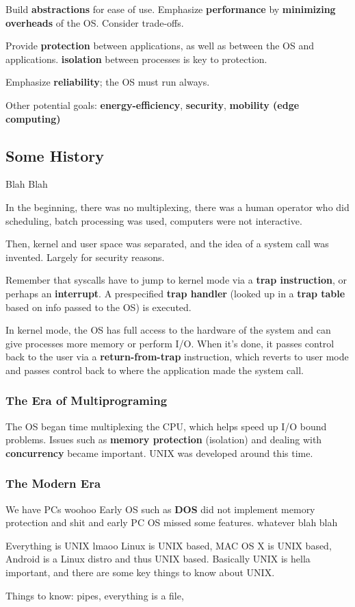 \documentclass{article}
\begin{document}
Build \textbf{abstractions} for ease of use.
Emphasize \textbf{performance} by \textbf{minimizing overheads} of the OS.
Consider trade-offs.

Provide \textbf{protection} between applications, as well as between the OS and applications.
\textbf{isolation} between processes is key to protection.

Emphasize \textbf{reliability}; the OS must run always.

Other potential goals: \textbf{energy-efficiency}, \textbf{security}, \textbf{mobility (edge computing)}

\subsection{Some History}

Blah Blah

In the beginning, there was no multiplexing, there was a human operator who did scheduling, batch processing was used, computers were not interactive.

Then, kernel and user space was separated, and the idea of a system call was invented.
Largely for security reasons.

Remember that syscalls have to jump to kernel mode via a \textbf{trap instruction}, or perhaps an \textbf{interrupt}.
A prespecified \textbf{trap handler} (looked up in a \textbf{trap table} based on info passed to the OS) is executed.

In kernel mode, the OS has full access to the hardware of the system and can give processes more memory or perform I/O.
When it's done, it passes control back to the user via a \textbf{return-from-trap} instruction, which reverts to user mode and passes control back to where the application made the system call.

\subsubsection{The Era of Multiprograming}

The OS began time multiplexing the CPU, which helps speed up I/O bound problems.
Issues such as \textbf{memory protection} (isolation) and dealing with \textbf{concurrency} became important.
UNIX was developed around this time.

\subsubsection{The Modern Era}

We have PCs woohoo
Early OS such as \textbf{DOS} did not implement memory protection and shit and early PC OS missed some features. whatever blah blah

Everything is UNIX lmaoo Linux is UNIX based, MAC OS X is UNIX based, Android is a Linux distro and thus UNIX based.
Basically UNIX is hella important, and there are some key things to know about UNIX.

Things to know: pipes, everything is a file, 
\end{document}
